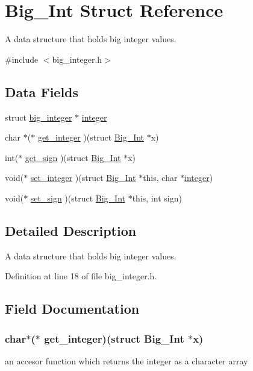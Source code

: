 \hypertarget{struct_big___int}{\section{Big\-\_\-\-Int Struct Reference}
\label{struct_big___int}
}


A data structure that holds big integer values.  




{\ttfamily \#include $<$big\-\_\-integer.\-h$>$}

\subsection*{Data Fields}
\begin{DoxyCompactItemize}
\item 
struct \hyperlink{big__integer__impl_8h_structbig__integer}{big\-\_\-integer} $\ast$ \hyperlink{struct_big___int_af78495b20eeda6242727ea99032693c2}{integer}
\item 
char $\ast$($\ast$ \hyperlink{struct_big___int_ac8d650b12656faee53d9ebd863e9fe8f}{get\-\_\-integer} )(struct \hyperlink{struct_big___int}{Big\-\_\-\-Int} $\ast$x)
\item 
int($\ast$ \hyperlink{struct_big___int_ae06ba678ba07ecdac264605bc8576da2}{get\-\_\-sign} )(struct \hyperlink{struct_big___int}{Big\-\_\-\-Int} $\ast$x)
\item 
void($\ast$ \hyperlink{struct_big___int_a34a65fb8d8cc2acf5a14a18c420ee774}{set\-\_\-integer} )(struct \hyperlink{struct_big___int}{Big\-\_\-\-Int} $\ast$this, char $\ast$\hyperlink{struct_big___int_af78495b20eeda6242727ea99032693c2}{integer})
\item 
void($\ast$ \hyperlink{struct_big___int_a70cf790b3af136aad25fa028cde3e801}{set\-\_\-sign} )(struct \hyperlink{struct_big___int}{Big\-\_\-\-Int} $\ast$this, int sign)
\end{DoxyCompactItemize}


\subsection{Detailed Description}
A data structure that holds big integer values. 

Definition at line 18 of file big\-\_\-integer.\-h.



\subsection{Field Documentation}
\hypertarget{struct_big___int_ac8d650b12656faee53d9ebd863e9fe8f}{
\subsubsection[{get\-\_\-integer}]{\setlength{\rightskip}{0pt plus 5cm}char$\ast$($\ast$ get\-\_\-integer)(struct {\bf Big\-\_\-\-Int} $\ast$x)}}\label{struct_big___int_ac8d650b12656faee53d9ebd863e9fe8f}
an accesor function which returns the integer as a character array 

